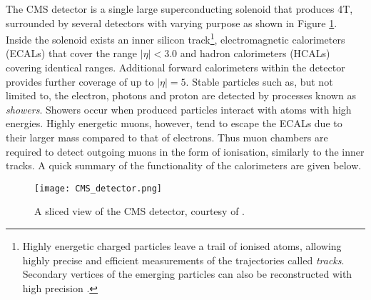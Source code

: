 The CMS detector \cite{chatrchyan2008cms} is a single large superconducting solenoid that produces 4T, surrounded by several detectors with varying purpose as shown in Figure \ref{fig:detector}. Inside the solenoid exists an inner silicon track\footnote{Highly energetic charged particles leave a trail of ionised atoms, allowing highly precise and efficient measurements of the trajectories called \textit{tracks}. Secondary vertices of the emerging particles can also be reconstructed with high precision \cite{chatrchyan2008cms}.}, electromagnetic calorimeters (ECALs) that cover the range $|\eta|<3.0$ and hadron calorimeters (HCALs) covering identical ranges. Additional forward calorimeters within the detector provides further coverage of up to $|\eta|=5$. Stable particles such as, but not limited to, the electron, photons and proton are detected by processes known as \textit{showers}. Showers occur when produced particles interact with atoms with high energies. Highly energetic muons, however, tend to escape the ECALs due to their larger mass compared to that of electrons. Thus muon chambers are required to detect outgoing muons in the form of ionisation, similarly to the inner tracks.  A quick summary of the functionality of the calorimeters are given below. \\

\begin{figure}[htbp]
    \centering
    \texttt{[image: CMS\_detector.png]}
    \caption{A sliced view of the CMS detector, courtesy of \cite{ATLASandCMSDetector}.}
    \label{fig:detector}
\end{figure}

